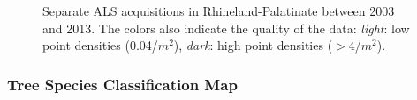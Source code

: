 \begin{figure}[H]
	\centering
	\caption{Separate ALS acquisitions in Rhineland-Palatinate between 2003 and 2013. The colors also indicate the quality of the data: \textit{light}: low point densities (0.04/$m^2$), \textit{dark}: high point densities ($>$4/$m^2$). }
	\label{abb:lidaryears}
\end{figure}



\subsubsection{Tree Species Classification Map}
\label{sec:regmod:tspecclass}


